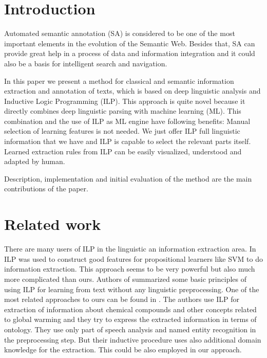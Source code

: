 \documentclass[runningheads,a4paper]{llncs}
\begin{document}
\section{Introduction}
Automated semantic annotation (SA) is considered to be one of the most important elements in the evolution of the Semantic Web. Besides that, SA can provide great help in a process of data and information integration and it could also be a basis for intelligent search and navigation.

In this paper we present a method for classical and semantic information extraction and annotation of texts, which is based on deep linguistic analysis and Inductive Logic Programming (ILP). This approach is quite novel because it directly combines deep linguistic parsing with machine learning (ML). This combination and the use of ILP as ML engine have following benefits: Manual selection of learning features is not needed. We just offer ILP full linguistic information that we have and ILP is capable to select the relevant parts itself. Learned extraction rules from ILP can be easily visualized, understood and adapted by human.

Description, implementation and initial evaluation of the method are the main contributions of the paper.




\section{Related work}
There are many users of ILP in the linguistic an information extraction area.
In \cite{Ramakrishnan:UsingILPforFeatures} ILP was used to construct good features for propositional learners like SVM to do information extraction. This approach seems to be very powerful but also much more complicated than ours. Authors of \cite{Junker99learningfor} summarized some basic principles of using ILP for learning from text without any linguistic preprocessing. One of the most related approaches to ours can be found in \cite{aitken02:_learn_infor_extrac_rules}. The authors use ILP for extraction of information about chemical compounds and other concepts related to global warming and they try to express the extracted information in terms of ontology. They use only part of speech analysis and named entity recognition in the preprocessing step. But their inductive procedure uses also additional domain knowledge for the extraction. This could be also employed in our approach.
\end{document}
